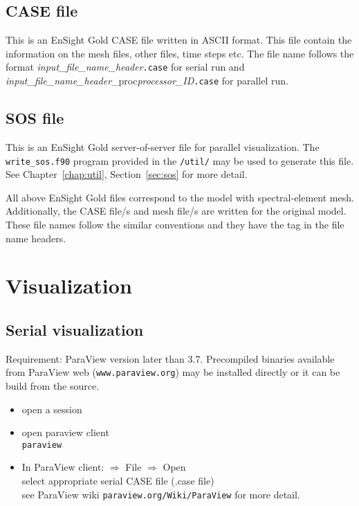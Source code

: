 \subsection{CASE file}

This is an EnSight Gold CASE file written in ASCII format. This file contain the information on the mesh files, other files, time steps etc. The file name follows the format \emph{input\_file\_name\_header}\texttt{.case} for serial run and \emph{input\_file\_name\_header}{\_proc}\emph{processor\_ID}\texttt{.case} for parallel run.

\subsection{SOS file}

This is an EnSight Gold server-of-server file for parallel visualization. The \texttt{write\_sos.f90} program provided in the \texttt{/util/} may be used to generate this file. See Chapter~\ref{chap:util}, Section~\ref{sec:sos} for more detail.

All above EnSight Gold files correspond to the model with spectral-element mesh. Additionally, the CASE file/s and mesh file/s are written for the original model. These file names follow the similar conventions and they have the tag \texttt{} in the file name headers.

\section{Visualization}
\subsection{Serial visualization}

Requirement: ParaView version later than 3.7. Precompiled binaries available from ParaView web (\texttt{www.paraview.org}) may be installed directly or it can be build from the source.

\begin{itemize}
\item open a session
\item open paraview client \\
\texttt{paraview}
\item In ParaView client: $\Rightarrow$ File $\Rightarrow$ Open\\
   select appropriate serial CASE file (.case file)\\
   see ParaView wiki \texttt{paraview.org/Wiki/ParaView} for more detail.
\end{itemize}

